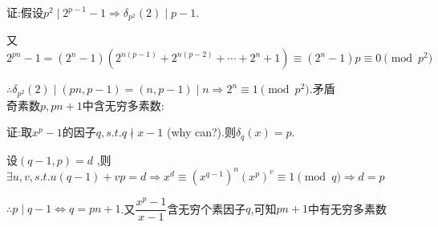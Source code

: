证:假设$ p^2 \mid 2^{p-1}-1\Rightarrow \delta_{p^2}(2)\mid p-1.$

又$ 2^{pn}-1=(2^n-1)(2^{n(p-1)}+2^{n(p-2)}+\cdots+2^n+1)\equiv(2^n-1)p\equiv 0\pmod{p^2}$

$ \therefore \delta_{p^2}(2)\mid (pn,p-1)=(n,p-1)\mid n\Rightarrow 2^n\equiv 1 \pmod {p^2}$.矛盾
\\

奇素数$ p,{pn+1}$中含无穷多素数:

证:取$ x^p-1$的因子$ q,s.t.q \nmid x-1$ (why can?).则$ \delta_q(x)=p$.

设$ (q-1,p)=d$ ,则$ \exists u,v,s.t.u(q-1)+vp=d\Rightarrow x^d\equiv(x^{q-1})^n(x^p)^v\equiv 1 \pmod q\Rightarrow d=p$ 

$ \therefore p\mid q-1\Leftrightarrow q=pn+1$.又$ \dfrac{x^p-1}{x-1}$含无穷个素因子$ q$,可知$ {pn+1}$中有无穷多素数
